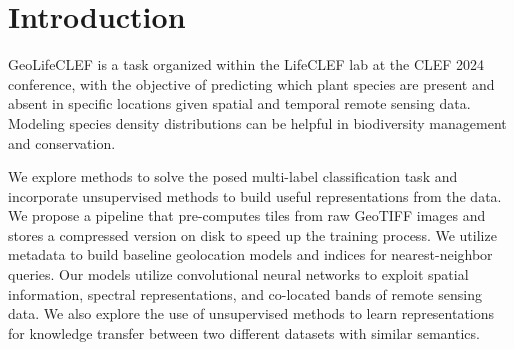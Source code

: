 \section{Introduction}

GeoLifeCLEF \cite{geolifeclef2024} is a task organized within the LifeCLEF lab \cite{lifeclef2024} at the CLEF 2024 conference, with the objective of predicting which plant species are present and absent in specific locations given spatial and temporal remote sensing data. 
Modeling species density distributions can be helpful in biodiversity management and conservation.

We explore methods to solve the posed multi-label classification task and incorporate unsupervised methods to build useful representations from the data. 
We propose a pipeline that pre-computes tiles from raw GeoTIFF images and stores a compressed version on disk to speed up the training process.
We utilize metadata to build baseline geolocation models and indices for nearest-neighbor queries.
Our models utilize convolutional neural networks to exploit spatial information, spectral representations, and co-located bands of remote sensing data.
We also explore the use of unsupervised methods to learn representations for knowledge transfer between two different datasets with similar semantics.
